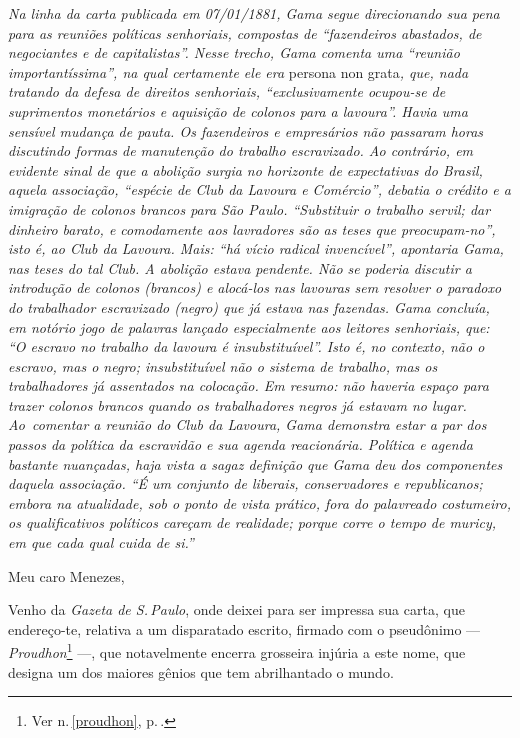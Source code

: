 \begin{resumo}
\emph{Na linha da carta publicada em 07/01/1881, Gama segue direcionando
sua pena para as reuniões políticas senhoriais, compostas de
``fazendeiros abastados, de negociantes e de capitalistas''. Nesse trecho,
Gama comenta uma ``reunião importantíssima'', na qual certamente ele era}
persona non grata\emph{, que, nada tratando da defesa de direitos senhoriais,
``exclusivamente ocupou-se de suprimentos monetários e aquisição de
colonos para a lavoura''. Havia uma sensível mudança de pauta. Os
fazendeiros e empresários não passaram horas discutindo formas de
manutenção do trabalho escravizado. Ao contrário, em evidente sinal de
que a abolição surgia no horizonte de expectativas do Brasil, aquela
associação, ``espécie de Club da Lavoura e Comércio'', debatia o crédito e
a imigração de colonos brancos para São Paulo. ``Substituir o trabalho
servil; dar dinheiro barato, e comodamente aos lavradores são as teses
que preocupam-no'', isto é, ao Club da Lavoura. Mais: ``há vício radical
invencível'', apontaria Gama, nas teses do tal Club. A abolição estava
pendente. Não se poderia discutir a introdução de colonos (brancos) e
alocá-los nas lavouras sem resolver o paradoxo do trabalhador
escravizado (negro) que já estava nas fazendas. Gama concluía, em
notório jogo de palavras lançado especialmente aos leitores senhoriais,
que: ``O escravo no trabalho da lavoura é insubstituível''. Isto é, no
contexto, não o escravo, mas o negro; insubstituível não o sistema de
trabalho, mas os trabalhadores já assentados na colocação. Em resumo:
não haveria espaço para trazer colonos brancos quando os trabalhadores
negros já estavam no lugar. Ao~comentar a reunião do Club da Lavoura,
Gama demonstra estar a par dos passos da política da escravidão e sua
agenda reacionária. Política e agenda bastante nuançadas, haja vista a
sagaz definição que Gama deu dos componentes daquela associação. ``É um
conjunto de liberais, conservadores e republicanos; embora na
atualidade, sob o ponto de vista prático, fora do palavreado costumeiro,
os qualificativos políticos careçam de realidade; porque corre o tempo
de muricy, em que cada qual cuida de si.''}
\end{resumo}\pagebreak

Meu caro Menezes,

Venho da \emph{Gazeta de S.\,Paulo}, onde deixei para ser impressa sua
carta, que endereço-te, relativa a um disparatado escrito, firmado com o
pseudônimo --- \emph{Proudhon}\footnote{Ver n.\,\ref{proudhon}, p.\,\pageref{proudhon}.}
---, que notavelmente encerra grosseira injúria a este nome, que
designa um dos maiores gênios que tem abrilhantado o mundo.

